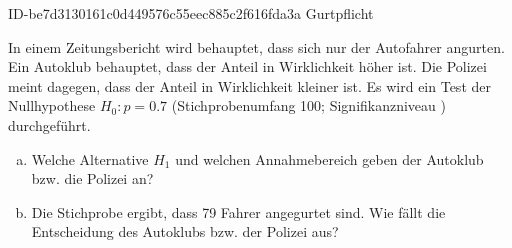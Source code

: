 \begin{exercise}
      {ID-be7d3130161c0d449576c55eec885c2f616fda3a}
      {Gurtpflicht}
  \ifproblem\problem\par
    In einem Zeitungsbericht wird behauptet, dass sich nur  der
    Autofahrer angurten. Ein Autoklub behauptet, dass der Anteil in Wirklichkeit
    höher ist. Die Polizei meint dagegen, dass der Anteil in Wirklichkeit
    kleiner ist. Es wird ein Test der Nullhypothese $H_0:p=\num{0.7}$
    (Stichprobenumfang 100; Signifikanzniveau ) durchgeführt.
    \begin{enumerate}[a)]
      \item Welche Alternative $H_1$ und welchen Annahmebereich geben der
            Autoklub bzw. die Polizei an?
      \item Die Stichprobe ergibt, dass 79 Fahrer angegurtet sind. Wie fällt
            die Entscheidung des Autoklubs bzw. der Polizei aus?
    \end{enumerate}
  \fi
\end{exercise}
